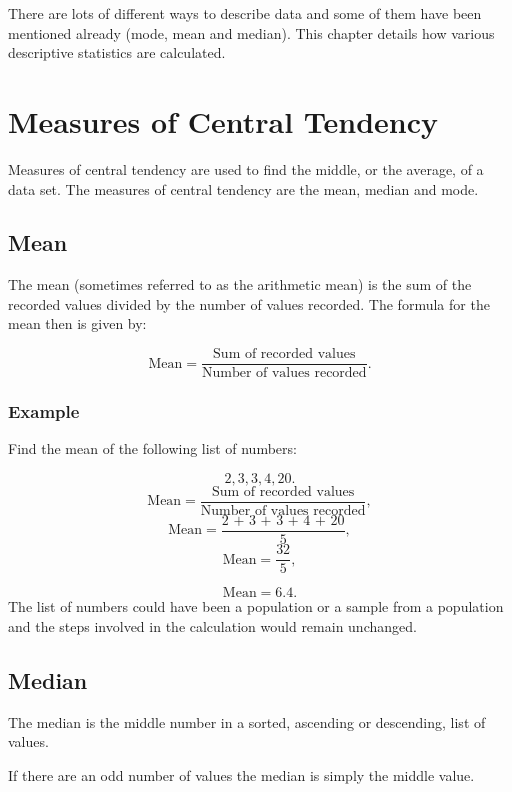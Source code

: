 \documentclass[
]{book}
\begin{document}
There are lots of different ways to describe data and some of them have been mentioned already (mode, mean and median). This chapter details how various descriptive statistics are calculated.

\hypertarget{measures-of-central-tendency}{%
\section{Measures of Central Tendency}\label{measures-of-central-tendency}}

Measures of central tendency are used to find the middle, or the average, of a data set. The measures of central tendency are the mean, median and mode.

\hypertarget{mean}{%
\subsection{Mean}\label{mean}}

The mean (sometimes referred to as the arithmetic mean) is the sum of the recorded values divided by the number of values recorded. The formula for the mean then is given by:

\[ \textrm{Mean} = \frac{\textrm{Sum of recorded values}}{\textrm{Number of values recorded}}.\]

\hypertarget{firstexamp}{%
\subsubsection{Example}\label{firstexamp}}

Find the mean of the following list of numbers:

\[ 2, 3, 3, 4, 20.\]
\[ \textrm{Mean} = \frac{\textrm{Sum of recorded values}}{\textrm{Number of values recorded}},\]
\[ \textrm{Mean} = \frac{\textrm{2 + 3 + 3 + 4 + 20}}{\textrm{5}},\]
\[ \textrm{Mean} = \frac{\textrm{32}}{\textrm{5}},\]

\[ \textrm{Mean} = 6.4.\]
The list of numbers could have been a population or a sample from a population and the steps involved in the calculation would remain unchanged.

\hypertarget{median}{%
\subsection{Median}\label{median}}

The median is the middle number in a sorted, ascending or descending, list of values.

If there are an odd number of values the median is simply the middle value.
\end{document}
